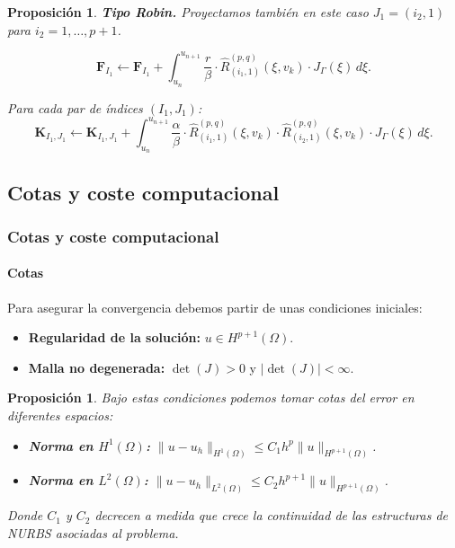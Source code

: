 \documentclass[compress]{beamer}
\newtheorem{proposition}[theorem]{Proposición}
\begin{document}
\begin{frame}
		\vspace{-5pt}
	\begin{proposition} \textbf{Tipo Robin.}
		Proyectamos también en este caso $J_1 = (i_2, 1)$ para $i_2=1,\dots,p+1$.

	{\setlength{\belowdisplayskip}{2pt}
    \begin{equation*}
        \mathbf{F}_{I_1} \leftarrow \mathbf{F}_{I_1} + \int_{u_n}^{u_{n+1}} \frac{r}{\beta} \cdot \hat{R}_{(i_1,1)}^{(p,q)}(\xi, v_k) \cdot J_{\Gamma}(\xi) \, d\xi.
    \end{equation*}
	}

		\vspace{-4pt}
	Para cada par de índices $(I_1, J_1)$:
	{\setlength{\abovedisplayskip}{3pt}
	\setlength{\belowdisplayskip}{2pt}
		\begin{equation*}
			\mathbf{K}_{I_1,J_1} \leftarrow \mathbf{K}_{I_1,J_1} + \int_{u_n}^{u_{n+1}} \frac{\alpha}{\beta} \cdot \hat{R}_{(i_1,1)}^{(p,q)}(\xi, v_k) \cdot \hat{R}_{(i_2,1)}^{(p,q)}(\xi, v_k) \cdot J_{\Gamma}(\xi) \, d\xi.
		\end{equation*}
	}
	\end{proposition}

\end{frame}
\subsection{Cotas y coste computacional}
\begin{frame}
	\frametitle{Cotas y coste computacional}
	\framesubtitle{Cotas}
	\begin{definition}
		Para asegurar la convergencia debemos partir de unas condiciones iniciales:
		\begin{itemize}
			\item \textbf{Regularidad de la solución:} $u\in H^{p+1}(\Omega)$.
			\item \textbf{Malla no degenerada:} $\det(J)>0$ y $|\det(J)|$$<\infty$.
		\end{itemize}
	\end{definition}

	\begin{proposition}
		Bajo estas condiciones podemos tomar cotas del error en diferentes espacios:

		\begin{itemize}
			\item \textbf{Norma en $H^1(\Omega)$:} $\| u - u_h \|_{H^1(\Omega)} \leq C_1 h^p \| u \|_{H^{p+1}(\Omega)}$.
			\item \textbf{Norma en $L^2(\Omega)$:} $\| u - u_h \|_{L^2(\Omega)} \le C_2 h^{p+1} \| u \|_{H^{p+1}(\Omega)}$.
		\end{itemize}
	Donde $C_1$ y $C_2$ decrecen a medida que crece la continuidad de las estructuras de NURBS asociadas al problema.
	\end{proposition}
\end{frame}
\end{document}
